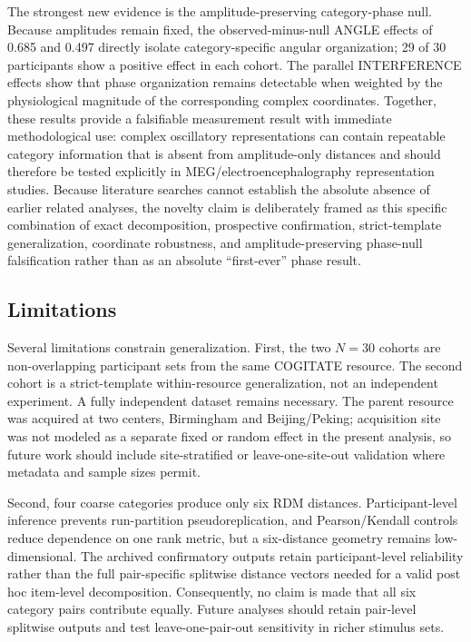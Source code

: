 \documentclass[11pt]{article}
\begin{document}
The strongest new evidence is the amplitude-preserving category-phase null. Because amplitudes remain fixed, the observed-minus-null ANGLE effects of 0.685 and 0.497 directly isolate category-specific angular organization; 29 of 30 participants show a positive effect in each cohort. The parallel INTERFERENCE effects show that phase organization remains detectable when weighted by the physiological magnitude of the corresponding complex coordinates. Together, these results provide a falsifiable measurement result with immediate methodological use: complex oscillatory representations can contain repeatable category information that is absent from amplitude-only distances and should therefore be tested explicitly in MEG/electroencephalography representation studies. Because literature searches cannot establish the absolute absence of earlier related analyses, the novelty claim is deliberately framed as this specific combination of exact decomposition, prospective confirmation, strict-template generalization, coordinate robustness, and amplitude-preserving phase-null falsification rather than as an absolute ``first-ever'' phase result.

\subsection{Limitations}
Several limitations constrain generalization. First, the two $N=30$ cohorts are non-overlapping participant sets from the same COGITATE resource. The second cohort is a strict-template within-resource generalization, not an independent experiment. A fully independent dataset remains necessary. The parent resource was acquired at two centers, Birmingham and Beijing/Peking; acquisition site was not modeled as a separate fixed or random effect in the present analysis, so future work should include site-stratified or leave-one-site-out validation where metadata and sample sizes permit.

Second, four coarse categories produce only six RDM distances. Participant-level inference prevents run-partition pseudoreplication, and Pearson/Kendall controls reduce dependence on one rank metric, but a six-distance geometry remains low-dimensional. The archived confirmatory outputs retain participant-level reliability rather than the full pair-specific splitwise distance vectors needed for a valid post hoc item-level decomposition. Consequently, no claim is made that all six category pairs contribute equally. Future analyses should retain pair-level splitwise outputs and test leave-one-pair-out sensitivity in richer stimulus sets.
\end{document}
